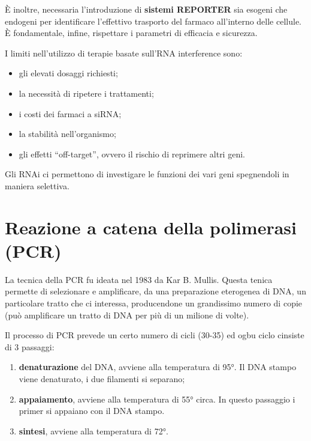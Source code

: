 \documentclass[11pt]{book}
\begin{document}
È inoltre, necessaria l'introduzione di \textbf{sistemi REPORTER} sia
esogeni che endogeni per identificare l'effettivo trasporto del farmaco
all'interno delle cellule. È fondamentale, infine, rispettare i
parametri di efficacia e sicurezza.

I limiti nell'utilizzo di terapie basate sull'RNA interference sono:

\begin{itemize}
\itemsep1pt\parskip0pt
\item
  gli elevati dosaggi richiesti;
\item
  la necessità di ripetere i trattamenti;
\item
  i costi dei farmaci a siRNA;
\item
  la stabilità nell'organismo;
\item
  gli effetti ``off-target'', ovvero il rischio di reprimere altri geni.
\end{itemize}

Gli RNAi ci permettono di investigare le funzioni dei vari geni
spegnendoli in maniera selettiva.

\chapter{Reazione a catena della polimerasi
(PCR)}\label{reazione-a-catena-della-polimerasi-pcr}

La tecnica della PCR fu ideata nel 1983 da Kar B. Mullis. Questa tenica
permette di selezionare e amplificare, da una preparazione eterogenea di
DNA, un particolare tratto che ci interessa, producendone un grandissimo
numero di copie (può amplificare un tratto di DNA per più di un milione
di volte).

Il processo di PCR prevede un certo numero di cicli (30-35) ed ogbu
ciclo cinsiste di 3 passaggi:

\begin{enumerate}
\def\labelenumi{\arabic{enumi}.}
\itemsep1pt\parskip0pt
\item
  \textbf{denaturazione} del DNA, avviene alla temperatura di 95°. Il
  DNA stampo viene denaturato, i due filamenti si separano;
\item
  \textbf{appaiamento}, avviene alla temperatura di 55° circa. In questo
  passaggio i primer si appaiano con il DNA stampo.
\item
  \textbf{sintesi}, avviene alla temperatura di 72°.
\end{enumerate}
\end{document}
